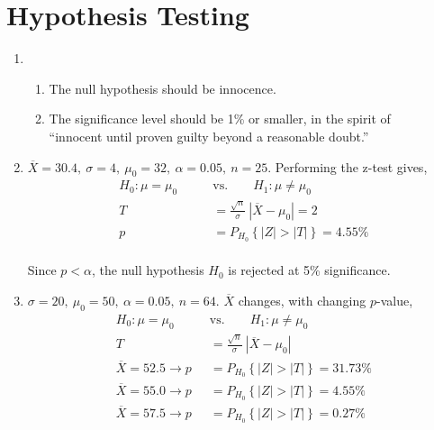 \chapter{Hypothesis Testing}

\begin{enumerate}
	
	\item 	\begin{enumerate}
		\item The null hypothesis should be innocence.\\
		
		\item The significance level should be 1\% or smaller, in the spirit of \\
		``innocent until proven guilty beyond a reasonable doubt.''
	\end{enumerate}
	
	\item $ \overline{X} = 30.4 ,\ \sigma = 4,\ \mu_0 = 32,\ \alpha = 0.05,\ n = 25$. Performing the z-test gives,\\
	
		\begin{align}
			H_0 : \mu = \mu_0 \qquad &\text{vs.} \qquad H_1 : \mu \neq \mu_0 \nonumber \\
			T &= \frac{\sqrt{n}}{\sigma}\ |\overline{X} - \mu_0| = 2 \nonumber \\
			p &= P_{H_0}\left\{|Z| > |T|\right\} = 4.55\% 
		\end{align}\\
		Since $ p < \alpha $, the null hypothesis $ H_0 $ is rejected at 5\% significance.\\
	
	
	\item $ \sigma = 20,\ \mu_0 = 50,\ \alpha = 0.05,\ n = 64$. $ \overline{X} $ changes, with changing $ p $-value,\\
	
		\begin{align}
			H_0 : \mu = \mu_0 \qquad &\text{vs.} \qquad H_1 : \mu \neq \mu_0 \nonumber \\
			T &= \frac{\sqrt{n}}{\sigma}\ |\overline{X} - \mu_0| \nonumber \\
			\overline{X} = 52.5 \to p &= P_{H_0}\left\{|Z| > |T|\right\} = 31.73\% \nonumber \\
			\overline{X} = 55.0 \to p &= P_{H_0}\left\{|Z| > |T|\right\} = 4.55\% \nonumber \\
			\overline{X} = 57.5 \to p &= P_{H_0}\left\{|Z| > |T|\right\} = 0.27\% 
		\end{align}\\
	

\end{enumerate}
